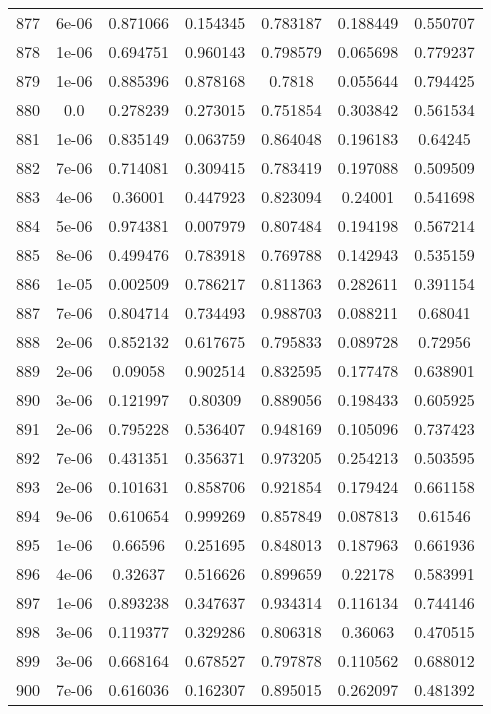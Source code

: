 \begin{table}
\begin{tabular*}{\linewidth}{c|c|c|c|c|c|c}
877 & 6e-06 & 0.871066 & 0.154345 & 0.783187 & 0.188449 & 0.550707\\
878 & 1e-06 & 0.694751 & 0.960143 & 0.798579 & 0.065698 & 0.779237\\
879 & 1e-06 & 0.885396 & 0.878168 & 0.7818 & 0.055644 & 0.794425\\
880 & 0.0 & 0.278239 & 0.273015 & 0.751854 & 0.303842 & 0.561534\\
881 & 1e-06 & 0.835149 & 0.063759 & 0.864048 & 0.196183 & 0.64245\\
882 & 7e-06 & 0.714081 & 0.309415 & 0.783419 & 0.197088 & 0.509509\\
883 & 4e-06 & 0.36001 & 0.447923 & 0.823094 & 0.24001 & 0.541698\\
884 & 5e-06 & 0.974381 & 0.007979 & 0.807484 & 0.194198 & 0.567214\\
885 & 8e-06 & 0.499476 & 0.783918 & 0.769788 & 0.142943 & 0.535159\\
886 & 1e-05 & 0.002509 & 0.786217 & 0.811363 & 0.282611 & 0.391154\\
887 & 7e-06 & 0.804714 & 0.734493 & 0.988703 & 0.088211 & 0.68041\\
888 & 2e-06 & 0.852132 & 0.617675 & 0.795833 & 0.089728 & 0.72956\\
889 & 2e-06 & 0.09058 & 0.902514 & 0.832595 & 0.177478 & 0.638901\\
890 & 3e-06 & 0.121997 & 0.80309 & 0.889056 & 0.198433 & 0.605925\\
891 & 2e-06 & 0.795228 & 0.536407 & 0.948169 & 0.105096 & 0.737423\\
892 & 7e-06 & 0.431351 & 0.356371 & 0.973205 & 0.254213 & 0.503595\\
893 & 2e-06 & 0.101631 & 0.858706 & 0.921854 & 0.179424 & 0.661158\\
894 & 9e-06 & 0.610654 & 0.999269 & 0.857849 & 0.087813 & 0.61546\\
895 & 1e-06 & 0.66596 & 0.251695 & 0.848013 & 0.187963 & 0.661936\\
896 & 4e-06 & 0.32637 & 0.516626 & 0.899659 & 0.22178 & 0.583991\\
897 & 1e-06 & 0.893238 & 0.347637 & 0.934314 & 0.116134 & 0.744146\\
898 & 3e-06 & 0.119377 & 0.329286 & 0.806318 & 0.36063 & 0.470515\\
899 & 3e-06 & 0.668164 & 0.678527 & 0.797878 & 0.110562 & 0.688012\\
900 & 7e-06 & 0.616036 & 0.162307 & 0.895015 & 0.262097 & 0.481392\\
\end{tabular*}
\end{table}
